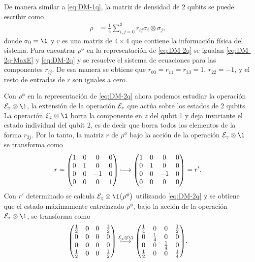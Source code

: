 De manera similar a \eqref{eq:DM-1q}, la matriz de densidad 
de 2 qubits se puede escribir como
\begin{align}
\rho&=\frac{1}{4}\sum _{i,j=0}^{3}r_{ij}\sigma_i\otimes\sigma_j,
\label{eq:DM-2q}
\end{align}
donde $\sigma_0=\1$ y $r$ es una matriz de $4\times4$ que contiene
la información física del sistema. Para encontrar $\rho^{\phi}$ en la
representación de \eqref{eq:DM-2q} se igualan 
\eqref{eq:DM-2q-MaxE} y \eqref{eq:DM-2q} y se resuelve
el sistema de ecuaciones para las componentes $r_{ij}$. De esa manera
se obtiene que $r_{00}=r_{11}=r_{33}=1$, $r_{22}=-1$, y el resto de 
entradas de $r$ son iguales a cero. 

Con $\rho^{\phi}$ en la representación de \eqref{eq:DM-2q} ahora
podemos estudiar la operación $\E_z\otimes\1$, la extensión 
de la operación $\mathcal{E}_z$ que actúa sobre los estados de 2 qubits. 
La operación $\E_z\otimes\1$ borra la componente en $z$ del 
qubit 1 y deja invariante el estado individual del qubit 2, 
es de decir que borra todos los elementos de la forma $r_{3j}$.
Por lo tanto, la matriz $r$ de $\rho^{\phi}$ bajo la acción de la 
operación $\E_z\otimes\1$ se transforma como
\begin{align}
r=
\mqty(
1&0&0&0\\
0&1&0&0\\
0&0&-1&0\\
0&0&0&1
)
\longmapsto
\mqty(
1&0&0&0\\
0&1&0&0\\
0&0&-1&0\\
0&0&0&0
)
=r'.
\end{align}
Con $r'$ determinado se calcula $\E_z\otimes\1\qty(\rho^{\phi})$ 
utilizando \eqref{eq:DM-2q} y se obtiene que el estado 
máximamente entrelazado $\rho^{\phi}$, bajo la acción de la
operación $\E_z\otimes\1$, se transforma como
\begin{align}
\mqty( 
\frac{1}{2} & 0 & 0 & \frac{1}{2} \\
0 & 0 & 0 & 0 \\
0 & 0 & 0 & 0 \\
\frac{1}{2} & 0 & 0 & \frac{1}{2} \\
)
\stackrel{\E_{z}\otimes\1}{\longmapsto}
\mqty( 
\frac{1}{4} & 0 & 0 & \frac{1}{2} \\
0 & \frac{1}{4} & 0 & 0 \\
0 & 0 & \frac{1}{4} & 0 \\
\frac{1}{2} & 0 & 0 & \frac{1}{4} \\
).
\end{align}

